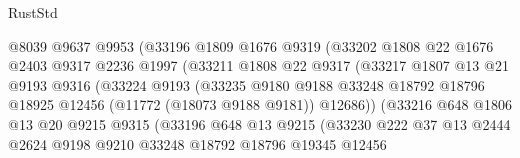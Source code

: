 \begin{lexlean}{RustStd}
\begin{coremodule}
                            @8039
                            @9637
                            @9953
                            (@33196
                              @1809
                              @1676
                              @9319
                              (@33202
                                @1808
                                @22
                                @1676
                                @2403
                                @9317
                                @2236
                                @1997
                                (@33211
                                  @1808
                                  @22
                                  @9317
                                  (@33217
                                    @1807
                                    @13
                                    @21
                                    @9193
                                    @9316
                                    (@33224
                                      @9193
                                      (@33235
                                        @9180
                                        @9188
                                        @33248
                                        @18792
                                        @18796
                                        @18925
                                        @12456
                                        (@11772 (@18073 @9188 @9181))
                                        @12686))
                                    (@33216
                                      @648
                                      @1806
                                      @13
                                      @20
                                      @9215
                                      @9315
                                      (@33196
                                        @648
                                        @13
                                        @9215
                                        (@33230
                                          @222
                                          @37
                                          @13
                                          @2444
                                          @2624
                                          @9198
                                          @9210
                                          @33248
                                          @18792
                                          @18796
                                          @19345
                                          @12456

\end{coremodule}
\end{lexlean}
